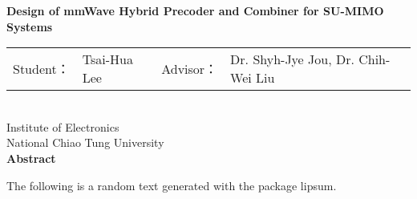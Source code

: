 \newpage
\thispagestyle{plain}
\begin{center}
	\TSzTwenty\selectfont
		\textbf{Design of mmWave Hybrid Precoder and Combiner for SU-MIMO Systems} \\[0.5cm]
	\TSzFourteen\selectfont
		\begin{tabular}{r l r l}
			Student： & Tsai-Hua Lee& \hspace{1cm} Advisor： & Dr. Shyh-Jye Jou, Dr. Chih-Wei Liu \\
		\end{tabular}
    \\[0.5cm]
	\TSzFourteen\selectfont
	Institute of Electronics \\[0.5cm]
	National Chiao Tung University \\[0.5cm]  
	\textbf{Abstract} \\[0.5cm]
\end{center}

\TSzTwelveThirty\selectfont
The following is a random text generated with the package lipsum.
\lipsum[3-5]


